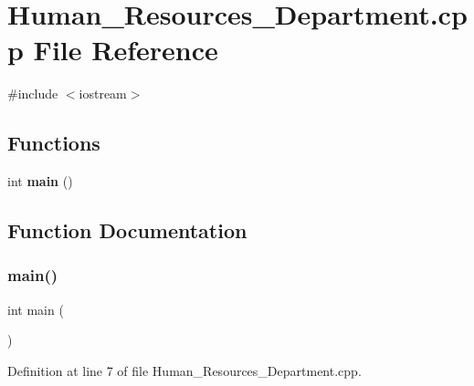 \section{Human\+\_\+\+Resources\+\_\+\+Department.\+cpp File Reference}
\label{_human___resources___department_8cpp}
{\ttfamily \#include $<$iostream$>$}\newline
\subsection*{Functions}
\begin{DoxyCompactItemize}
\item 
int \textbf{ main} ()
\end{DoxyCompactItemize}


\subsection{Function Documentation}
\mbox{\label{_human___resources___department_8cpp_ae66f6b31b5ad750f1fe042a706a4e3d4}} 
\subsubsection{main()}
{\footnotesize\ttfamily int main (\begin{DoxyParamCaption}{ }\end{DoxyParamCaption})}



Definition at line 7 of file Human\+\_\+\+Resources\+\_\+\+Department.\+cpp.

